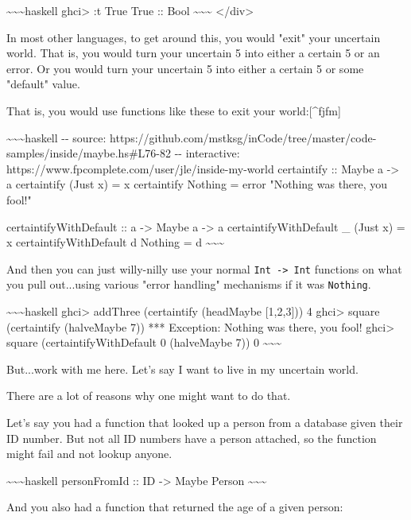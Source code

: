 \documentclass[]{article}
\begin{document}
\textasciitilde{}\textasciitilde{}\textasciitilde{}haskell ghci\textgreater{} :t
True True :: Bool \textasciitilde{}\textasciitilde{}\textasciitilde{}
\textless{}/div\textgreater{}

In most other languages, to get around this, you would "exit" your uncertain
world. That is, you would turn your uncertain 5 into either a certain 5 or an
error. Or you would turn your uncertain 5 into either a certain 5 or some
"default" value.

That is, you would use functions like these to exit your world:{[}\^{}fjfm{]}

\textasciitilde{}\textasciitilde{}\textasciitilde{}haskell -\/- source:
https://github.com/mstksg/inCode/tree/master/code-samples/inside/maybe.hs\#L76-82
-\/- interactive: https://www.fpcomplete.com/user/jle/inside-my-world
certaintify :: Maybe a -\textgreater{} a certaintify (Just x) = x certaintify
Nothing = error "Nothing was there, you fool!"

certaintifyWithDefault :: a -\textgreater{} Maybe a -\textgreater{} a
certaintifyWithDefault \_ (Just x) = x certaintifyWithDefault d Nothing = d
\textasciitilde{}\textasciitilde{}\textasciitilde{}

And then you can just willy-nilly use your normal
\texttt{Int\ -\textgreater{}\ Int} functions on what you pull out...using
various "error handling" mechanisms if it was \texttt{Nothing}.

\textasciitilde{}\textasciitilde{}\textasciitilde{}haskell ghci\textgreater{}
addThree (certaintify (headMaybe {[}1,2,3{]})) 4 ghci\textgreater{} square
(certaintify (halveMaybe 7)) *** Exception: Nothing was there, you fool!
ghci\textgreater{} square (certaintifyWithDefault 0 (halveMaybe 7)) 0
\textasciitilde{}\textasciitilde{}\textasciitilde{}

But...work with me here. Let's say I want to live in my uncertain world.

There are a lot of reasons why one might want to do that.

Let's say you had a function that looked up a person from a database given their
ID number. But not all ID numbers have a person attached, so the function might
fail and not lookup anyone.

\textasciitilde{}\textasciitilde{}\textasciitilde{}haskell personFromId :: ID
-\textgreater{} Maybe Person \textasciitilde{}\textasciitilde{}\textasciitilde{}

And you also had a function that returned the age of a given person:
\end{document}
